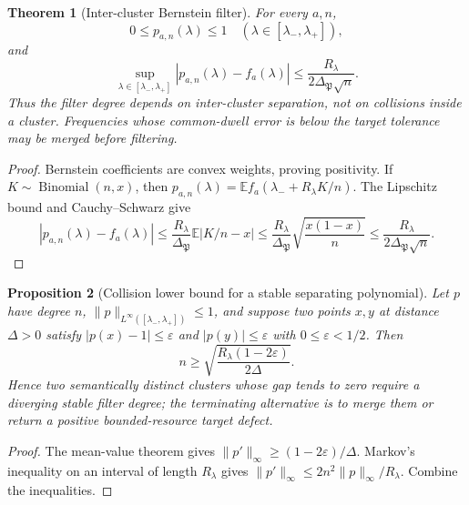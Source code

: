 \documentclass[11pt]{article}
\newtheorem{theorem}{Theorem}[section]
\newtheorem{proposition}[theorem]{Proposition}
\theoremstyle{definition}
\theoremstyle{remark}
\newcommand{\norm}[1]{\lVert#1\rVert}
\begin{document}
\begin{theorem}[Inter-cluster Bernstein filter]
\label{thm:cluster-Bernstein-filter-master}
For every $a,n$,
\begin{equation}
 \boxed{0\le p_{a,n}(\lambda)\le1
 \quad(\lambda\in[\lambda_-,\lambda_+]),}
 \label{eq:cluster-filter-positive-master}
\end{equation}
and
\begin{equation}
 \boxed{
 \sup_{\lambda\in[\lambda_-,\lambda_+]}
 |p_{a,n}(\lambda)-f_a(\lambda)|
 \le\frac{R_\lambda}{2\Delta_{\mathfrak P}\sqrt n}.}
 \label{eq:cluster-filter-error-master}
\end{equation}
Thus the filter degree depends on inter-cluster separation, not on collisions
inside a cluster.  Frequencies whose common-dwell error is below the target
tolerance may be merged before filtering.
\end{theorem}

\begin{proof}
Bernstein coefficients are convex weights, proving positivity.  If
$K\sim\operatorname{Binomial}(n,x)$, then
$p_{a,n}(\lambda)=\mathbb E f_a(\lambda_-+R_\lambda K/n)$.  The Lipschitz
bound and Cauchy--Schwarz give
\[
 |p_{a,n}(\lambda)-f_a(\lambda)|
 \le\frac{R_\lambda}{\Delta_{\mathfrak P}}
 \mathbb E|K/n-x|
 \le\frac{R_\lambda}{\Delta_{\mathfrak P}}
 \sqrt{\frac{x(1-x)}n}
 \le\frac{R_\lambda}{2\Delta_{\mathfrak P}\sqrt n}.
\]
\end{proof}

\begin{proposition}[Collision lower bound for a stable separating polynomial]
\label{prop:cluster-collision-lower-master}
Let $p$ have degree $n$, $\norm p_{L^\infty([\lambda_-,\lambda_+])}\le1$, and
suppose two points $x,y$ at distance $\Delta>0$ satisfy
$|p(x)-1|\le\varepsilon$ and $|p(y)|\le\varepsilon$ with
$0\le\varepsilon<1/2$.  Then
\begin{equation}
 \boxed{
 n\ge
 \sqrt{\frac{R_\lambda(1-2\varepsilon)}{2\Delta}}.}
 \label{eq:cluster-collision-lower-master}
\end{equation}
Hence two semantically distinct clusters whose gap tends to zero require a
diverging stable filter degree; the terminating alternative is to merge them
or return a positive bounded-resource target defect.
\end{proposition}

\begin{proof}
The mean-value theorem gives
$\norm{p'}_\infty\ge(1-2\varepsilon)/\Delta$.  Markov's inequality on an
interval of length $R_\lambda$ gives
$\norm{p'}_\infty\le2n^2\norm p_\infty/R_\lambda$.  Combine the inequalities.
\end{proof}
\end{document}

